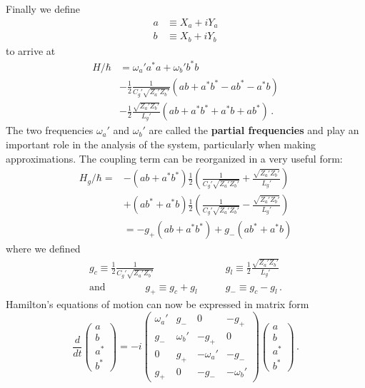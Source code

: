 \documentclass{article}
\begin{document}
Finally we define
\begin{align}
  a &\equiv X_a + i Y_a \nonumber \\
  b &\equiv X_b + i Y_b
\end{align}
to arrive at
\begin{align}
  H / \hbar
  &= \omega_a' a^* a + \omega_b' b^* b \nonumber \\
  & - \frac{1}{2} \frac{1}{C_g' \sqrt{Z_a' Z_b'}} (ab + a^* b^* - a b^* - a^* b) \nonumber \\
  &- \frac{1}{2} \frac{\sqrt{Z_a' Z_b'}}{L_g'} (ab + a^* b^* + a^* b + a b^*)
  \, .
\end{align}
The two frequencies $\omega_a'$ and $\omega_b'$ are called the \textbf{partial frequencies} and play an important role in the analysis of the system, particularly when making approximations.
The coupling term can be reorganized in a very useful form:
\begin{align}
  H_g / \hbar =
  &- \left( a b + a^* b^* \right)
    \frac{1}{2} \left(
      \frac{1}{C_g' \sqrt{Z_a' Z_b'}} + \frac{\sqrt{Z_a' Z_b'}}{L_g'}
    \right) \nonumber \\
  &+ \left( a b^* + a^* b \right)
    \frac{1}{2} \left(
      \frac{1}{C_g' \sqrt{Z_a' Z_b'}} - \frac{\sqrt{Z_a' Z_b'}}{L_g'}
    \right) \nonumber \\
  &= -g_+ (ab + a^* b^*) + g_- (ab^* + a^* b)
\end{align}
where we defined
\begin{align}
  g_c \equiv \frac{1}{2} \frac{1}{C_g' \sqrt{Z_a' Z_b'}} &\qquad
  g_l \equiv \frac{1}{2} \frac{\sqrt{Z_a' Z_b'}}{L_g'} \nonumber \\
  \text{and} \qquad \qquad
  g_+ \equiv g_c + g_l &\qquad g_- \equiv g_c - g_l
  \, .
\end{align}
Hamilton's equations of motion can now be expressed in matrix form
\begin{equation*}
  \frac{d}{dt}
  \left( \begin{array}{c} a \\ b \\ a^* \\ b^* \end{array} \right)
  = -i \left( \begin{array}{cccc}
    \omega_a' & g_- & 0 & -g_+ \\
    g_- & \omega_b' & -g_+ & 0 \\
    0 & g_+ & -\omega_a' & -g _- \\
    g_+ & 0 & -g_- & -\omega_b'
  \end{array} \right)
  \left( \begin{array}{c} a \\ b \\ a^* \\ b^* \end{array} \right) \, .
\end{equation*}
\end{document}
